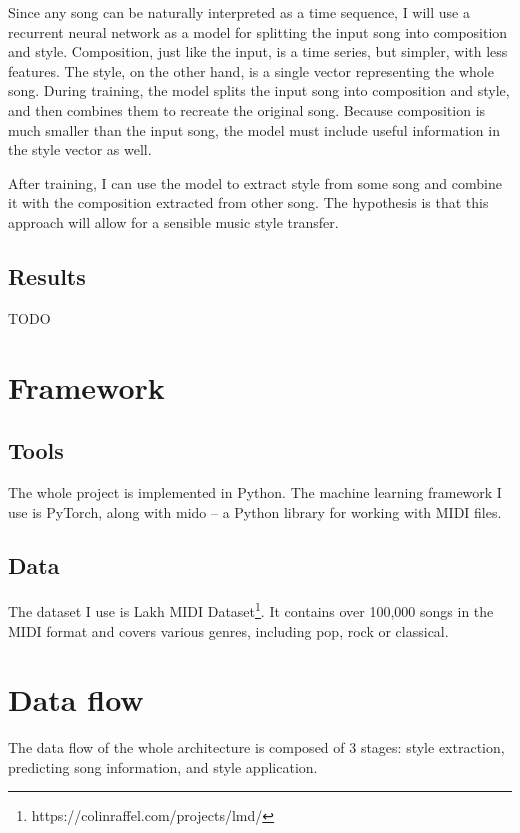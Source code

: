 \documentclass[en]{pracamgr}
\begin{document}
Since any song can be naturally interpreted as a time sequence, I will use a recurrent neural network as a model for splitting the input song into composition and style.
Composition, just like the input, is a time series, but simpler, with less features.
The style, on the other hand, is a single vector representing the whole song.
During training, the model splits the input song into composition and style, and then combines them to recreate the original song.
Because composition is much smaller than the input song, the model must include useful information in the style vector as well.

After training, I can use the model to extract style from some song and combine it with the composition extracted from other song.
The hypothesis is that this approach will allow for a sensible music style transfer.

\section{Results}

TODO

\chapter{Framework}

\section{Tools}

The whole project is implemented in Python.
The machine learning framework I use is PyTorch, along with mido -- a Python library for working with MIDI files.

\section{Data}

The dataset I use is Lakh MIDI Dataset\footnote{https://colinraffel.com/projects/lmd/}.
It contains over 100,000 songs in the MIDI format and covers various genres, including pop, rock or classical.

\chapter{Data flow}

The data flow of the whole architecture is composed of 3 stages: style extraction, predicting song information, and style application.
\end{document}
